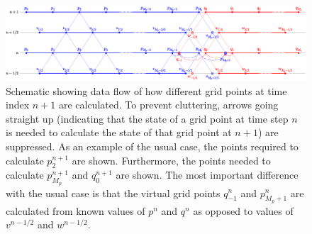 \begin{figure}[t]
    \centering
    \includegraphics[width = \textwidth]{Figures/tromboneSchematic.eps}
    \caption{Schematic showing data flow of how different grid points at time index $n+1$ are calculated. To prevent cluttering, arrows going straight up (indicating that the state of a grid point at time step $n$ is needed to calculate the state of that grid point at $n+1$) are suppressed. As an example of the usual case, the points required to calculate $p_2^{n+1}$ are shown. Furthermore, the points needed to calculate $p_{M_p}^{n+1}$ and $q_0^{n+1}$ are shown. The most important difference with the usual case is that the virtual grid points $q_{-1}^n$ and $p_{M_p+1}^n$ are calculated from known values of $p^n$ and $q^n$ as opposed to values of $v^{n-1/2}$ and $w^{n-1/2}$.\label{fig:tromboneSchematic}}
\end{figure}
